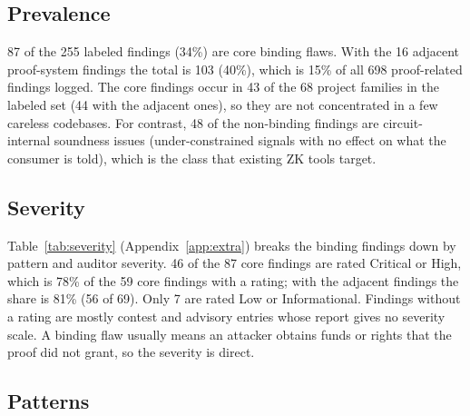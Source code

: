 \subsection{Prevalence}\label{sec:study-prev}

87 of the 255 labeled findings (34\%) are core binding flaws. With the 16
adjacent proof-system findings the total is 103 (40\%), which is 15\% of all
698 proof-related findings logged. The core findings occur in 43 of the 68
project families in the labeled set (44 with the adjacent ones), so they are
not concentrated in a few careless codebases.
For contrast, 48 of the non-binding findings are circuit-internal soundness
issues (under-constrained signals with no effect on what the consumer is
told), which is the class that existing ZK tools target.


\subsection{Severity}\label{sec:study-sev}

Table~\ref{tab:severity} (Appendix~\ref{app:extra}) breaks the binding
findings down by pattern and auditor severity. 46 of the 87 core findings are rated Critical or High,
which is 78\% of the 59 core findings with a rating; with the adjacent
findings the share is 81\% (56 of 69). Only 7 are rated Low or
Informational. Findings without a rating are mostly contest and advisory
entries whose report gives no severity scale.
A binding flaw usually means an attacker obtains funds or rights that the
proof did not grant, so the severity is direct.




\subsection{Patterns}\label{sec:study-patterns}

